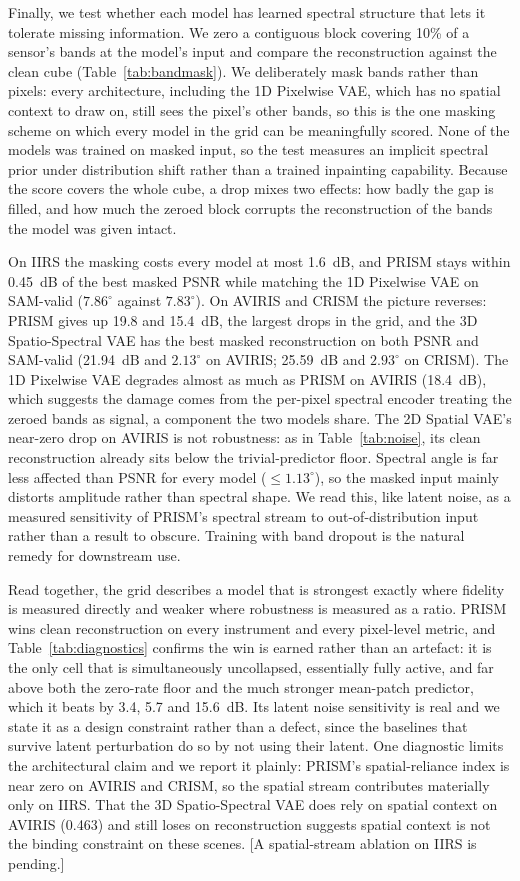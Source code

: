 \documentclass[twoside,11pt]{article}
\begin{document}
Finally, we test whether each model has learned spectral structure that lets it tolerate missing information. We zero a contiguous block covering 10\% of a sensor's bands at the model's input and compare the reconstruction against the clean cube (Table~\ref{tab:bandmask}). We deliberately mask bands rather than pixels: every architecture, including the 1D Pixelwise VAE, which has no spatial context to draw on, still sees the pixel's other bands, so this is the one masking scheme on which every model in the grid can be meaningfully scored. None of the models was trained on masked input, so the test measures an implicit spectral prior under distribution shift rather than a trained inpainting capability. Because the score covers the whole cube, a drop mixes two effects: how badly the gap is filled, and how much the zeroed block corrupts the reconstruction of the bands the model was given intact.

On IIRS the masking costs every model at most 1.6~dB, and PRISM stays within 0.45~dB of the best masked PSNR while matching the 1D Pixelwise VAE on SAM-valid ($7.86^\circ$ against $7.83^\circ$). On AVIRIS and CRISM the picture reverses: PRISM gives up 19.8 and 15.4~dB, the largest drops in the grid, and the 3D Spatio-Spectral VAE has the best masked reconstruction on both PSNR and SAM-valid (21.94~dB and $2.13^\circ$ on AVIRIS; 25.59~dB and $2.93^\circ$ on CRISM). The 1D Pixelwise VAE degrades almost as much as PRISM on AVIRIS (18.4~dB), which suggests the damage comes from the per-pixel spectral encoder treating the zeroed bands as signal, a component the two models share. The 2D Spatial VAE's near-zero drop on AVIRIS is not robustness: as in Table~\ref{tab:noise}, its clean reconstruction already sits below the trivial-predictor floor. Spectral angle is far less affected than PSNR for every model ($\le 1.13^\circ$), so the masked input mainly distorts amplitude rather than spectral shape. We read this, like latent noise, as a measured sensitivity of PRISM's spectral stream to out-of-distribution input rather than a result to obscure. Training with band dropout is the natural remedy for downstream use.

Read together, the grid describes a model that is strongest exactly where fidelity is measured directly and weaker where robustness is measured as a ratio. PRISM wins clean reconstruction on every instrument and every pixel-level metric, and Table~\ref{tab:diagnostics} confirms the win is earned rather than an artefact: it is the only cell that is simultaneously uncollapsed, essentially fully active, and far above both the zero-rate floor and the much stronger mean-patch predictor, which it beats by 3.4, 5.7 and 15.6~dB. Its latent noise sensitivity is real and we state it as a design constraint rather than a defect, since the baselines that survive latent perturbation do so by not using their latent. One diagnostic limits the architectural claim and we report it plainly: PRISM's spatial-reliance index is near zero on AVIRIS and CRISM, so the spatial stream contributes materially only on IIRS. That the 3D Spatio-Spectral VAE does rely on spatial context on AVIRIS (0.463) and still loses on reconstruction suggests spatial context is not the binding constraint on these scenes. [A spatial-stream ablation on IIRS is pending.]
\end{document}
